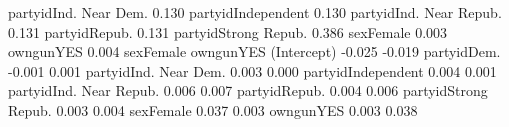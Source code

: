 \begin{Schunk}
\begin{Soutput}
partyidInd. Near Dem.                  0.130
partyidIndependent                     0.130
partyidInd. Near Repub.                0.131
partyidRepub.                          0.131
partyidStrong Repub.                   0.386
sexFemale                              0.003
owngunYES                              0.004
                        sexFemale owngunYES
(Intercept)                -0.025    -0.019
partyidDem.                -0.001     0.001
partyidInd. Near Dem.       0.003     0.000
partyidIndependent          0.004     0.001
partyidInd. Near Repub.     0.006     0.007
partyidRepub.               0.004     0.006
partyidStrong Repub.        0.003     0.004
sexFemale                   0.037     0.003
owngunYES                   0.003     0.038
\end{Soutput}
\end{Schunk}
